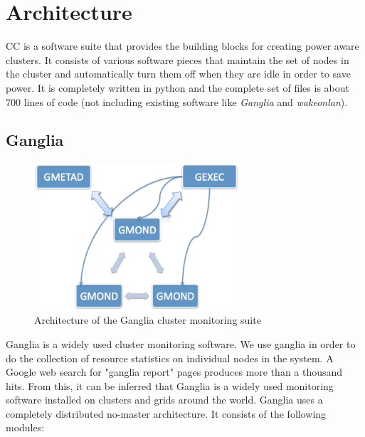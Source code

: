 \section{Architecture} %
\label{sec:architecture}
CC is a software suite that provides the building blocks for creating power aware clusters. It consists of various software pieces that maintain the set of nodes in the cluster and automatically turn them off when they are idle in order to save power. It is completely written in python and the complete set of files is about 700 lines of code (not including existing software like \emph{Ganglia} and \emph{wakeonlan}).

\subsection{Ganglia} %
\label{sub:ganglia}
\begin{figure}[ht]
\centering
\begin{center}
\includegraphics[width=3.0in]{graphs/ganglia-arch.pdf}
\vspace{-0.1in}
\caption{{\normalsize Architecture of the Ganglia cluster monitoring suite}\label{fig:ganglia-arch}}
\vspace{-0.1in}
\end{center}
\end{figure}
Ganglia is a widely used cluster monitoring software. We use ganglia in order to do the collection of resource statistics on individual nodes in the system. A Google web search for "ganglia report" pages produces more than a thousand hits. From this, it can be inferred that Ganglia is a widely used monitoring software installed on clusters and grids around the world. Ganglia uses a completely distributed no-master architecture. It consists of the following modules:
